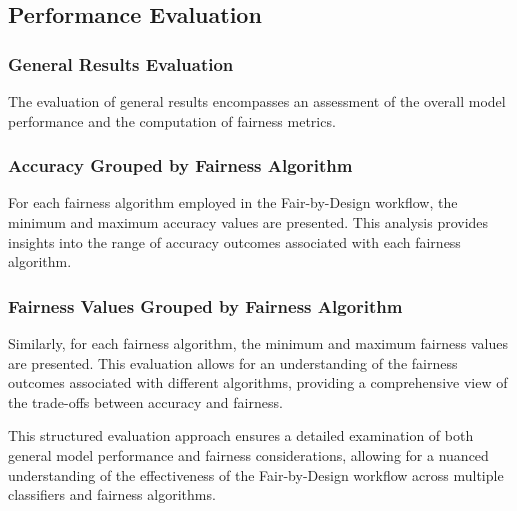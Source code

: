 \subsection{Performance Evaluation}

\subsubsection{General Results Evaluation}

The evaluation of general results encompasses an assessment of the overall model performance and the computation of fairness metrics.

\subsubsection{Accuracy Grouped by Fairness Algorithm}

For each fairness algorithm employed in the Fair-by-Design workflow, the minimum and maximum accuracy values are presented. This analysis provides insights into the range of accuracy outcomes associated with each fairness algorithm.

\subsubsection{Fairness Values Grouped by Fairness Algorithm}

Similarly, for each fairness algorithm, the minimum and maximum fairness values are presented. This evaluation allows for an understanding of the fairness outcomes associated with different algorithms, providing a comprehensive view of the trade-offs between accuracy and fairness.

This structured evaluation approach ensures a detailed examination of both general model performance and fairness considerations, allowing for a nuanced understanding of the effectiveness of the Fair-by-Design workflow across multiple classifiers and fairness algorithms.